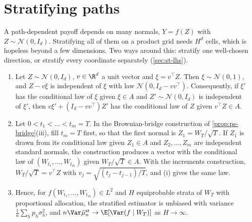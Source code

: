 \section{Stratifying paths}\label{sec:st-paths}

A path-dependent payoff depends on many normals, $Y=f(Z)$ with $Z\sim\mathcal N(0,I_d)$.
Stratifying all of them on a product grid needs $H^d$ cells, which is hopeless beyond a few
dimensions. Two ways around this: stratify one well-chosen direction, or stratify every
coordinate separately (\cref{sec:st-lhs}).

\begin{proposition}\label{prop:st-bridge}
\begin{enumerate}[label=(\roman*)]
  \item Let $Z\sim\mathcal N(0,I_d)$, $v\in\R^d$ a unit vector and $\xi=v^\top Z$. Then
    $\xi\sim\mathcal N(0,1)$, and $Z-v\xi$ is independent of $\xi$ with law
    $\mathcal N(0,I_d-vv^\top)$. Consequently, if $\xi'$ has the conditional law of $\xi$
    given $\xi\in A$ and $Z'\sim\mathcal N(0,I_d)$ is independent of $\xi'$, then
    $v\xi'+(I_d-vv^\top)Z'$ has the conditional law of $Z$ given $v^\top Z\in A$.
  \item Let $0<t_1<\dots<t_m=T$. In the Brownian-bridge construction of
    \cref{prop:ps-bridge}(iii), fill $t_m=T$ first, so that the first normal is $Z_1=W_T/\sqrt T$.
    If $Z_1$ is drawn from its conditional law given $Z_1\in A$ and $Z_2,\dots,Z_m$ are
    independent standard normals, the construction produces a vector with the conditional law
    of $(W_{t_1},\dots,W_{t_m})$ given $W_T/\sqrt T\in A$. With the increments construction,
    $W_T/\sqrt T=v^\top Z$ with $v_j=\sqrt{(t_j-t_{j-1})/T}$, and (i) gives the same law.
  \item Hence, for $f(W_{t_1},\dots,W_{t_m})\in L^2$ and $H$ equiprobable strata of $W_T$ with
    proportional allocation, the stratified estimator is unbiased with variance
    $\frac1n\sum_hp_h\sigma_h^2$, and $n\Var\hat\mu^{\mathrm{st}}_n\to\E[\Var(f\mid W_T)]$
    as $H\to\infty$.
\end{enumerate}
\end{proposition}

